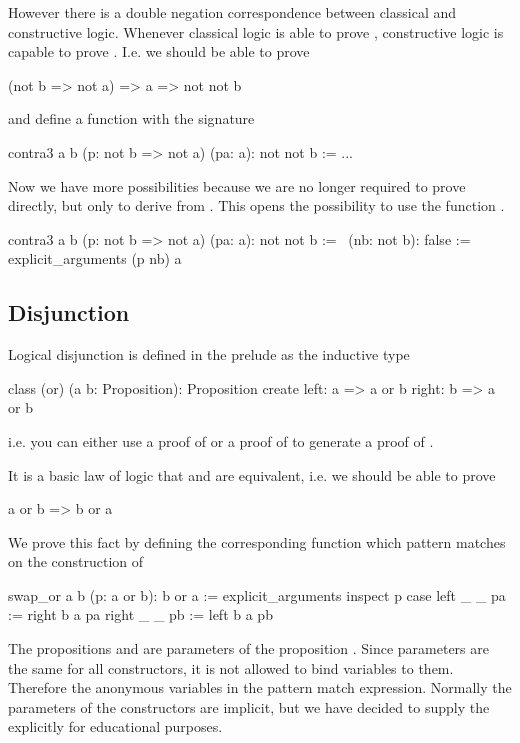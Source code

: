 However there is a double negation correspondence between classical and
constructive logic. Whenever classical logic is able to prove ,
constructive logic is capable to prove . I.e. we should be
able to prove
\begin{alba}
  (not b => not a) => a => not not b
\end{alba}
and define a function with the signature
%
\begin{alba}
  contra3 a b (p: not b => not a) (pa: a): not not b :=
    ...
\end{alba}
%
Now we have more possibilities because we are no longer required to prove
 directly, but only to derive  from . This
opens the possibility to use the function .
%
\begin{alba}
  contra3 a b (p: not b => not a) (pa: a): not not b :=
    \ (nb: not b): false :=
        explicit_arguments
          (p nb) a
\end{alba}



\subsection{Disjunction}

Logical disjunction is defined in the prelude as the inductive type
%
\begin{alba}
  class
    (or) (a b: Proposition): Proposition
  create
    left:  a => a or b
    right: b => a or b
\end{alba}
%
i.e. you can either use a proof of  or a proof of  to generate
a proof of .

It is a basic law of logic that  and  are
equivalent, i.e. we should be able to prove
%
\begin{alba}
  a or b  =>  b or a
\end{alba}
%
We prove this fact by defining the corresponding function which pattern
matches on the construction of 
%
\begin{alba}
  swap_or a b (p: a or b): b or a :=
    explicit_arguments
      inspect
        p
      case
        left  _ _ pa := right b a pa
        right _ _ pb := left  b a pb
\end{alba}

The propositions  and  are parameters of the proposition
. Since parameters are the same for all constructors, it is not
allowed to bind variables to them. Therefore the anonymous variables \code{\_}
in the pattern match expression. Normally the parameters of the constructors
are implicit, but we have decided to supply the explicitly for educational
purposes.

